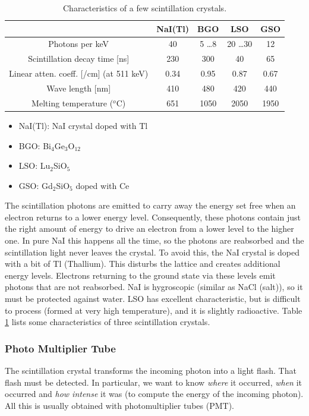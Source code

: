 \documentclass[11pt,oneside]{article}
\begin{document}
\begin{table}
\centering
\caption{Characteristics of a few scintillation crystals.}
\label{tab:crystals}
\begin{tabular}{|c|c|c|c|c|}
\hline
       & NaI(Tl) &    BGO      & LSO      & GSO \\
\hline
Photons per keV                    
        &  40     & 5 \ldots 8  & 20 \ldots 30 &  12\\
Scintillation decay time [ns]
        & 230     &  300  & 40  & 65 \\
Linear atten. coeff. [/cm] (at 511 keV)
        & 0.34    & 0.95  & 0.87  & 0.67\\
 Wave length [nm]
        & 410     & 480   & 420 & 440 \\
Melting temperature ($^o$C)
        & 651 & 1050 & 2050 & 1950 \\
\hline
\end{tabular}
\begin{itemize}
\item NaI(Tl): NaI crystal doped with Tl
\item BGO: Bi$_4$Ge$_{3}$O$_{12}$
\item LSO: Lu$_2$SiO$_5$
\item GSO: Gd$_2$SiO$_5$ doped with Ce
\end{itemize}
\end{table}

The scintillation photons are emitted to carry away the energy set
free when an electron returns to a lower energy level. Consequently,
these photons contain just the right amount of energy to drive an
electron from a lower level to the higher one. In pure NaI this
happens all the time, so the photons are reabsorbed and the
scintillation light never leaves the crystal. To avoid this, the NaI
crystal is doped with a bit of Tl (Thallium). This disturbs the
lattice and creates additional energy levels. Electrons returning to
the ground state via these levels emit photons that are not
reabsorbed.  NaI is hygroscopic (similar as NaCl (salt)), so it must
be protected against water. LSO has excellent characteristic, but is
difficult to process (formed at very high temperature), and it is
slightly radioactive. Table \ref{tab:crystals} lists some
characteristics of three scintillation crystals.

\subsubsection{Photo Multiplier Tube}
The scintillation crystal transforms the incoming photon into a light flash.
That flash must be detected. In particular, we want to know {\em where} it
occurred, {\em when} it occurred and {\em how intense} it was (to compute the
energy of the incoming photon). All this is usually obtained with
photomultiplier tubes (PMT).
\end{document}
